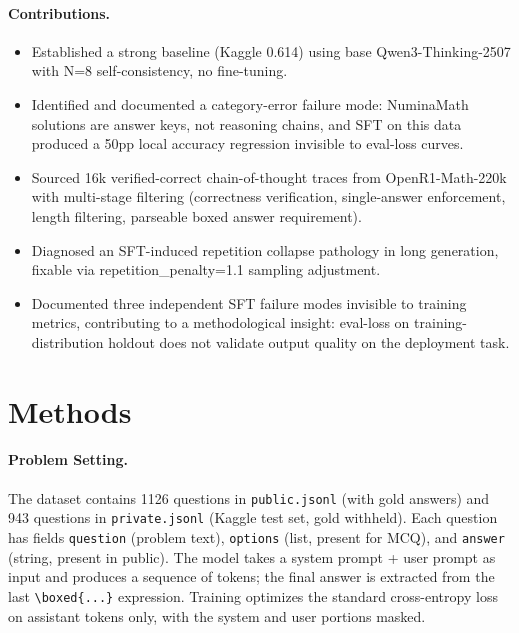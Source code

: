 \documentclass{article}
\begin{document}
\paragraph{Contributions.}
\begin{itemize}
    \item Established a strong baseline (Kaggle 0.614) using base Qwen3-Thinking-2507 with N=8 self-consistency, no fine-tuning.
    \item Identified and documented a category-error failure mode: NuminaMath solutions are answer keys, not reasoning chains, and SFT on this data produced a 50pp local accuracy regression invisible to eval-loss curves.
    \item Sourced 16k verified-correct chain-of-thought traces from OpenR1-Math-220k with multi-stage filtering (correctness verification, single-answer enforcement, length filtering, parseable boxed answer requirement).
    \item Diagnosed an SFT-induced repetition collapse pathology in long generation, fixable via repetition\_penalty=1.1 sampling adjustment.
    \item Documented three independent SFT failure modes invisible to training metrics, contributing to a methodological insight: eval-loss on training-distribution holdout does not validate output quality on the deployment task.
\end{itemize}

\section{Methods}
\label{sec:methods}

\paragraph{Problem Setting.}
The dataset contains 1126 questions in \texttt{public.jsonl} (with gold answers) and 943 questions in \texttt{private.jsonl} (Kaggle test set, gold withheld). Each question has fields \texttt{question} (problem text), \texttt{options} (list, present for MCQ), and \texttt{answer} (string, present in public). The model takes a system prompt + user prompt as input and produces a sequence of tokens; the final answer is extracted from the last \texttt{\textbackslash boxed\{...\}} expression. Training optimizes the standard cross-entropy loss on assistant tokens only, with the system and user portions masked.
\end{document}
